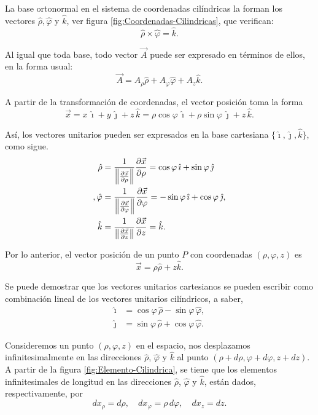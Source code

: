 La base ortonormal en el sistema de coordenadas cilíndricas la forman los vectores $\hat{\rho}, \hat{\varphi}$ y $\hat{k}$, ver figura \ref{fig:Coordenadas-Cilindricas}, que verifican:
$$\hat{\rho} \times \hat{\varphi} = \hat{k}.$$

Al igual que toda base, todo vector $\Vec{A}$ puede ser expresado en términos de ellos, en la forma usual:
$$\Vec{A} = A_{\rho} \hat{\rho}  + A_{\varphi} \hat{\varphi} + A_z \hat{k}.$$

A partir de la transformación de coordenadas, el vector posición toma la forma
$$\Vec{x} = x \,\hat{\imath} + y \,\hat{\jmath} + z \,\hat{k} = \rho \cos \varphi \,\hat{\imath} + \rho \sin \varphi \,\hat{\jmath} + z \,\hat{k}.$$

Así, los vectores unitarios pueden ser expresados en la base cartesiana $\{\hat{\imath}, \hat{\jmath}, \hat{k}\}$, como sigue.
\begin{align*}
    \hat{\rho} &= \frac{1}{\left\lVert\frac{\partial \Vec{x}}{\partial \rho}\right\rVert}\frac{\partial \Vec{x}}{\partial \rho} = \cos \varphi \,\hat{\imath} + \sin \varphi \,\hat{\jmath} \\,
    \hat{\varphi} &= \frac{1}{\left\lVert\frac{\partial \Vec{x}}{\partial \varphi}\right\rVert}\frac{\partial \Vec{x}}{\partial \varphi} = - \sin \varphi \,\hat{\imath} + \cos \varphi \, \hat{\jmath},  \\
    \hat{k} &= \frac{1}{\left\lVert\frac{\partial \Vec{x}}{\partial z}\right\rVert}\frac{\partial \Vec{x}}{\partial z} = \hat{k} .
\end{align*}

Por lo anterior, el vector posición de un punto $P$ con coordenadas $(\rho, \varphi,z)$ es 
\begin{equation*}
\vec{x} = \rho \hat{\rho} + z \hat{k}.
\end{equation*}

Se puede demostrar que los vectores unitarios cartesianos se pueden escribir como combinación lineal de los vectores unitarios cilíndricos, a saber,
\begin{align*}
    \hat{\imath} &= \cos \varphi \,\hat{\rho} - \sin \varphi \, \hat{\varphi}, \\
    \hat{\jmath} &= \sin\varphi \, \hat{\rho} + \cos \varphi \,\hat{\varphi}.
\end{align*}

Consideremos un punto $(\rho, \varphi, z)$ en el espacio, nos desplazamos infinitesimalmente en las direcciones $\hat{\rho}$, $\hat{\varphi}$ y $\hat{k}$ al punto $(\rho + d\rho, \varphi + d\varphi, z + dz)$. A partir de la figura \ref{fig:Elemento-Cilindrica}, se tiene que los elementos infinitesimales de longitud en las direcciones $\hat{\rho}$, $\hat{\varphi}$ y $\hat{k}$, están dados, respectivamente, por
$$dx_{\rho} = d\rho, \quad dx_{\varphi} = \rho \,d\varphi, \quad dx_z = dz.$$

